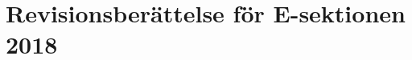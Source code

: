 \documentclass[../_main/handlingar.tex]{subfiles}
\begin{document}
\section{Revisionsberättelse för E-sektionen 2018}
\end{document}
